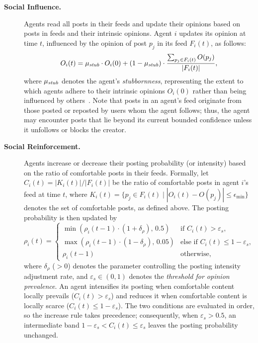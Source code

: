 \documentclass[pdflatex,sn-mathphys-num]{sn-jnl}%
\theoremstyle{thmstyleone}%
\theoremstyle{thmstyletwo}%
\theoremstyle{thmstylethree}%
\def\post{\rho} %
\def\Stubbornness{\mu_{\it stub}}
\def\ThofOpPreval{\varepsilon_s}
\begin{document}
\begin{description}
\item[{\bf Social Influence.}] Agents read all posts in their feeds
  and update their opinions based on posts in feeds and their intrinsic
  opinions. Agent $i$ updates its opinion at time $t$, influenced by
  the opinion of post $p_j$ in its feed $F_i(t)$, as follows:
  \begin{equation}\label{FJmodel}
   O_i(t) = \Stubbornness \cdot O_i(0) + (1 - \Stubbornness) \cdot \frac{\sum_{p_j \in F_i(t)} O(p_j)}{|F_i(t)|},
  \end{equation}
where $\Stubbornness$ denotes the agent’s \emph{stubbornness},
representing the extent to which agents adhere to their intrinsic
opinions $O_i(0)$ rather than being influenced by others~\cite{Friedkin1990}. Note that
posts in an agent's feed originate from those posted or reposted by
users whom the agent follows; thus, the agent may encounter posts that lie
beyond its current bounded confidence unless it unfollows or blocks the creator.


\item[{\bf Social Reinforcement.}]
 Agents increase or decrease
  their posting probability (or intensity) based on the
  ratio of comfortable posts in their feeds. Formally, let $C_i(t)=
  |K_i(t)|/|F_i(t)|$ be the ratio of comfortable posts in agent $i$'s
  feed at time $t$, where $K_i(t)=\{p_j \in F_i(t) \mid |O_i(t) - O(p_j)|
  \leq \epsilon_{\min}\}$ denotes the set of comfortable posts, as defined above. The posting
  probability is then updated by
  \begin{equation}\label{eq:SocialReinforcement}
    \post_i(t) =
    \begin{cases}
      \min(\post_i(t-1) \cdot (1 + \delta_{\post}),\, 0.5)
        & \text{if } C_i(t) > \ThofOpPreval,\\[2pt]
      \max(\post_i(t-1) \cdot (1 - \delta_{\post}),\, 0.05)
        & \text{else if } C_i(t) \leq 1-\ThofOpPreval,\\[2pt]
      \post_i(t-1) & \text{otherwise,}
    \end{cases}
  \end{equation}
where $\delta_{\post}$ ($> 0$) denotes the parameter controlling the
posting intensity adjustment rate, and $\ThofOpPreval \in (0,1)$ denotes
the {\em threshold for opinion prevalence}. An agent intensifies its posting
when comfortable content locally prevails ($C_i(t) > \ThofOpPreval$) and
reduces it when comfortable content is locally scarce ($C_i(t) \leq 1-\ThofOpPreval$).
The two conditions are evaluated in order, so the increase rule takes precedence;
consequently, when $\ThofOpPreval > 0.5$, an intermediate band
$1-\ThofOpPreval < C_i(t) \leq \ThofOpPreval$ leaves the posting probability unchanged.


\end{description}
\end{document}
